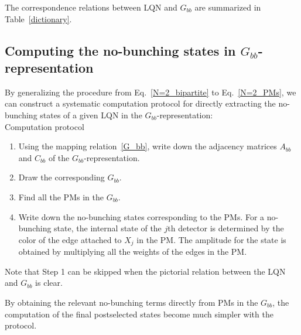 \documentclass[a4paper,twocolumn,8pt,accepted=2021-12-15]{quantumarticle}
\begin{document}
	\twocolumngrid

	The correspondence relations between LQN and $G_{bb}$ are summarized in Table~\ref{dictionary}.
	
	\subsection{Computing the no-bunching states in $G_{bb}$-representation}\label{computation_protocol}
	
	By generalizing the procedure from Eq.~\eqref{N=2_bipartite} to Eq.~\eqref{N=2_PMs}, we can construct a systematic computation protocol for directly extracting the no-bunching states of a given LQN in the $G_{bb}$-representation:\\
	$ $\\
	Computation protocol
	\begin{enumerate}
		\item
		Using the mapping relation~\eqref{G_bb}, write down the adjacency matrices $A_{bb}$ and $C_{bb}$ of the $G_{bb}$-representation.
		\item
		Draw the corresponding $G_{bb}$.
		\item  
		Find all the PMs in the $G_{bb}$.
		\item
		Write down the no-bunching states corresponding to the PMs. For a no-bunching state, the internal state of the $j$th detector is determined by the color of the edge attached to $X_j$ in the PM.  The amplitude for the state is obtained by multiplying all the weights of the edges in the PM.
	\end{enumerate}
	Note that Step 1 can be skipped when the pictorial relation between the LQN and $G_{bb}$ is clear.
	
	By obtaining the relevant no-bunching terms directly from PMs in  the $G_{bb}$, the computation of the final postselected states become much simpler with the protocol.
	
\end{document}
